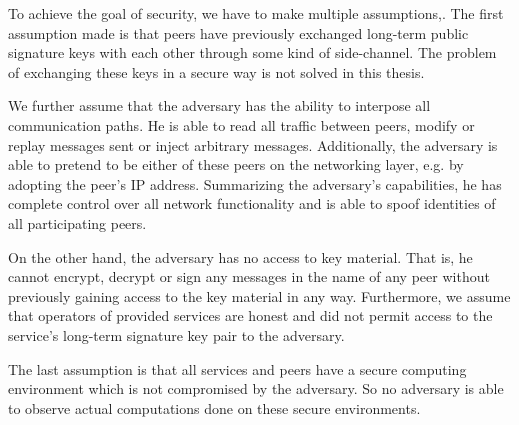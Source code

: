 To achieve the goal of security, we have to make multiple assumptions,.
The first assumption made is that peers have previously exchanged long-term public signature keys with each other through some kind of side-channel.
The problem of exchanging these keys in a secure way is not solved in this thesis.

We further assume that the adversary has the ability to interpose all communication paths.
He is able to read all traffic between peers, modify or replay messages sent or inject arbitrary messages.
Additionally, the adversary is able to pretend to be either of these peers on the networking layer, e.g. by adopting the peer's IP address.
Summarizing the adversary's capabilities, he has complete control over all network functionality and is able to spoof identities of all participating peers.

On the other hand, the adversary has no access to key material.
That is, he cannot encrypt, decrypt or sign any messages in the name of any peer without previously gaining access to the key material in any way.
Furthermore, we assume that operators of provided services are honest and did not permit access to the service's long-term signature key pair to the adversary.

The last assumption is that all services and peers have a secure computing environment which is not compromised by the adversary.
So no adversary is able to observe actual computations done on these secure environments.

